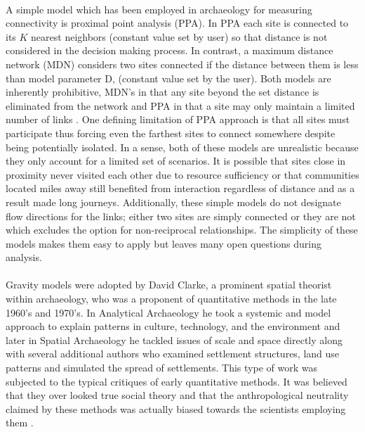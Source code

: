 \documentclass[12pt,a4paper]{thesis}
\begin{document}
\paragraph{}
A simple model which has been employed in archaeology \citep{Bro00} for measuring connectivity is proximal point analysis (PPA). In PPA each site is connected to its $K$ nearest neighbors (constant value set by user) so that distance is not considered in the decision making process. In contrast, a maximum distance network (MDN) considers two sites connected if the distance between them is less than model parameter D, (constant value set by the user). Both models are inherently prohibitive, MDN's in that any site beyond the set distance is eliminated from the network and PPA in that a site may only maintain a limited number of links \cite[5-10]{ERK12}. One defining limitation of PPA approach is that all sites must participate thus forcing even the farthest sites to connect somewhere despite being potentially isolated. In a sense, both of these models are unrealistic because they only account for a limited set of scenarios. It is possible that sites close in proximity never visited each other due to resource sufficiency or  that communities located miles away still benefited from interaction regardless of distance and as a result made long journeys. Additionally, these simple models do not designate flow directions for the links; either two sites are simply connected or they are not which excludes the option for non-reciprocal relationships. The simplicity of these models makes them easy to apply but leaves many open questions during analysis.

\paragraph{}	
Gravity models were  adopted by David Clarke, a prominent spatial theorist within archaeology, who was a proponent of quantitative methods in the late 1960's and 1970's. In Analytical Archaeology he took a systemic and model approach to explain patterns in culture, technology, and the environment \citep{Cla68} and later in Spatial Archaeology \citep{Cla77}  he tackled issues of scale and space directly along with several additional authors who examined settlement structures, land use patterns and simulated the spread of settlements. This type of work was subjected  to the typical critiques of early quantitative methods. It was believed that  they over looked true social theory and that the anthropological neutrality claimed by these methods was actually biased towards the scientists employing them \cite[72]{Hod03}.
\end{document}
